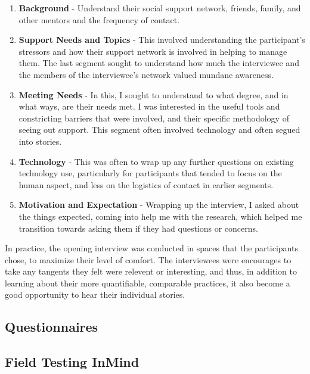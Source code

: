   \begin{enumerate}
  \item \textbf{Background} -
    Understand their social support network,
    friends, family, and other mentors and the frequency of contact.

  \item \textbf{Support Needs and Topics} -
    This involved understanding the participant's stressors and how their
    support network is involved in helping to manage them.
    The last segment sought to understand how much the interviewee
    and the members of the interviewee's network valued
    mundane awareness.

  \item \textbf{Meeting Needs} -
    In this, I sought to understand to what degree,
    and in what ways, are their needs met.
    I was interested in the useful tools and constricting barriers
    that were involved,
    and their specific methodology of seeing out support.
    This segment often involved technology and often segued into stories.

  \item \textbf{Technology} -
    This was often to wrap up any further questions on existing technology use,
    particularly for participants that tended to focus on the human aspect,
    and less on the logistics of contact in earlier segments.

  \item \textbf{Motivation and Expectation} - 
    Wrapping up the interview, I asked about the things expected,
    coming into help me with the research,
    which helped me transition towards asking them if they had questions
    or concerns.
  \end{enumerate}

  In practice, the opening interview was conducted in spaces
  that the participants chose, to maximize their level of comfort.
  The interviewees were encourages to take any tangents they felt
  were relevent or interesting, and thus,
  in addition to learning about their more quantifiable, comparable practices,
  it also become a good opportunity to hear their individual stories.

  \subsection{Questionnaires}

  \subsection{Field Testing InMind}

